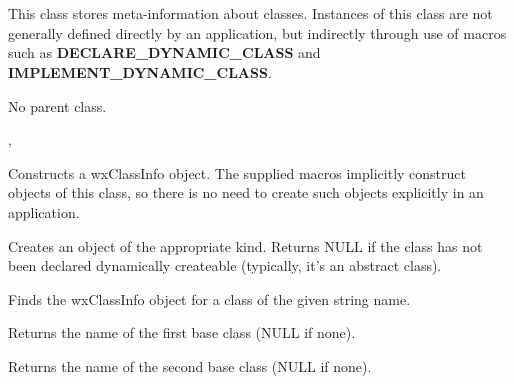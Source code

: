 \section{}\label{wxclassinfo}

This class stores meta-information about classes. Instances of this class are
not generally defined directly by an application, but indirectly through use
of macros such as {\bf DECLARE\_DYNAMIC\_CLASS} and {\bf IMPLEMENT\_DYNAMIC\_CLASS}.


No parent class.


, 


\label{wxclassinfoconstr}


Constructs a wxClassInfo object. The supplied macros implicitly construct objects of this
class, so there is no need to create such objects explicitly in an application.



Creates an object of the appropriate kind. Returns NULL if the class has not been declared
dynamically createable (typically, it's an abstract class).



Finds the wxClassInfo object for a class of the given string name.



Returns the name of the first base class (NULL if none).



Returns the name of the second base class (NULL if none).

